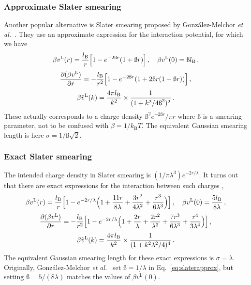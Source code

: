 \documentclass[12pt,a4paper]{article}
\newcommand{\latin}[1]{\emph{#1}}
\newcommand{\etal}{\latin{et al.}}
\newcommand{\kB}{k_{\mathrm{B}}}
\newcommand{\kT}{\kB T}
\newcommand{\lr}{^{\mathrm{L}}}
\newcommand{\varbeta}{\text{\ss}}
\newcommand{\Eqref}[1]{Eq.~\eqref{#1}}
\begin{document}
\subsubsection{Approximate Slater smearing}
%
Another popular alternative is Slater smearing proposed by
Gonz\'alez-Melchor \etal\ \cite{GM+06}.  They use an approximate
expression for the interaction potential, for which we have
%
\begin{equation}
  \beta v\lr(r)=\frac{\lB}{r}\Bigl[1-e^{-2\varbeta r}(1+\varbeta r)\Bigr]\,,
  \quad \beta v\lr(0)=\varbeta\lB\,,
  \label{eq:slaterapprox}
\end{equation}
%
\begin{equation}
  \frac{\partial(\beta v\lr)}{\partial r}=
  -\frac{\lB}{r^2}\Bigl[1-e^{-2\varbeta r}(1+2\varbeta r(1+\varbeta r))\Bigr]\,,
\end{equation}
%
\begin{equation}
  \beta {\tilde v}\lr(k)=\frac{4\pi\lB}{k^2}
  \times\frac{1}{(1+k^2/4\varbeta^2)^2}\,.
\end{equation}
%
These actually corresponds to a charge density $\varbeta^2
e^{-2\varbeta r}/\pi r$ where $\varbeta$ is a smearing parameter, not
to be confused with $\beta=1/\kT$. The equivalent Gaussian smearing
length is here $\sigma=1/\varbeta\sqrt{2}$.

\subsubsection{Exact Slater smearing}
%
The intended charge density in Slater smearing is
$(1/\pi\lambda^3)e^{-2r/\lambda}$.  It turns out that there are exact
expressions for the interaction between such charges \cite{WV14},
%
\begin{equation}
  \beta v\lr(r)=\frac{\lB}{r}\Bigl[1-e^{-2r/\lambda}\Bigl(
    1+\frac{11r}{8\lambda}+\frac{3r^2}{4\lambda^2}
    +\frac{r^3}{6\lambda^3}\Bigr)\Bigr]\,,
  \quad \beta v\lr(0)=\frac{5\lB}{8\lambda}\>,
  \label{eq:slaterexact}
\end{equation}
%
\begin{equation}
  \frac{\partial(\beta v\lr)}{\partial r}=
  -\frac{\lB}{r^2}\Bigl[1-e^{-2r/\lambda}\Bigl(
    1+\frac{2r}{\lambda}+\frac{2r^2}{\lambda^2}
    +\frac{7r^3}{6\lambda^3}+\frac{r^4}{3\lambda^4}\Bigr)\Bigr]\,,
\end{equation}
%
\begin{equation}
  \beta {\tilde v}\lr(k)=\frac{4\pi\lB}{k^2}
  \times\frac{1}{(1+k^2\lambda^2/4)^4}\,.
\end{equation}
%
The equivalent Gaussian smearing length for these exact expressions is
$\sigma=\lambda$.  Originally, Gon\-z\'a\-lez-Melchor
\etal\ \cite{GM+06} set $\varbeta=1/\lambda$ in
\Eqref{eq:slaterapprox}, but setting
$\varbeta=5/(8\lambda)$ matches the values of $\beta v\lr(0)$.
\end{document}
